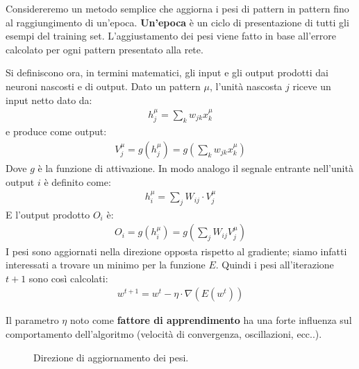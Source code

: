 Considereremo un metodo semplice che aggiorna i pesi di pattern in pattern fino al raggiungimento di un'epoca. \textbf{Un'epoca} è un ciclo di presentazione di tutti gli esempi del training set.
L'aggiustamento dei pesi viene fatto in base all'errore calcolato per ogni pattern presentato alla rete.
\newpage

Si definiscono ora, in termini matematici, gli input e gli output prodotti dai neuroni nascosti e di output.
Dato un pattern $\mu$, l'unità nascosta $j$ riceve un input netto dato da:
\begin{align}
    h_j^\mu = \sum_k w_{jk} x^\mu_k
\end{align}
e produce come output:
\begin{align}
    V_j^\mu = g(h_j^\mu) = g\left(\sum_k w_{jk} x^\mu_k \right)
\end{align}
Dove $g$ è la funzione di attivazione. In modo analogo il segnale entrante nell'unità output $i$ è definito come:
\begin{align}
    h_i^\mu = \sum_j W_{ij} \cdot V^\mu_j
\end{align}
E l'output prodotto $O_i$ è:
\begin{align}
    O_i = g(h^\mu_i) = g\left(\sum_j W_{ij} V^\mu_j \right)
\end{align} 
I pesi sono aggiornati nella direzione opposta rispetto al gradiente; siamo infatti interessati a trovare un minimo per la funzione $E$. Quindi i pesi all'iterazione $t + 1$ sono così calcolati:
\begin{align*}
    w^{t+1} = w^t - \eta \cdot \nabla (E(w^t))
\end{align*}


Il parametro $\eta$ noto come \textbf{fattore di apprendimento} ha una forte influenza sul comportamento dell'algoritmo (velocità di convergenza, oscillazioni, ecc..).

\begin{figure}[h!]
    \centering
    \caption{Direzione di aggiornamento dei pesi.}
\end{figure}


